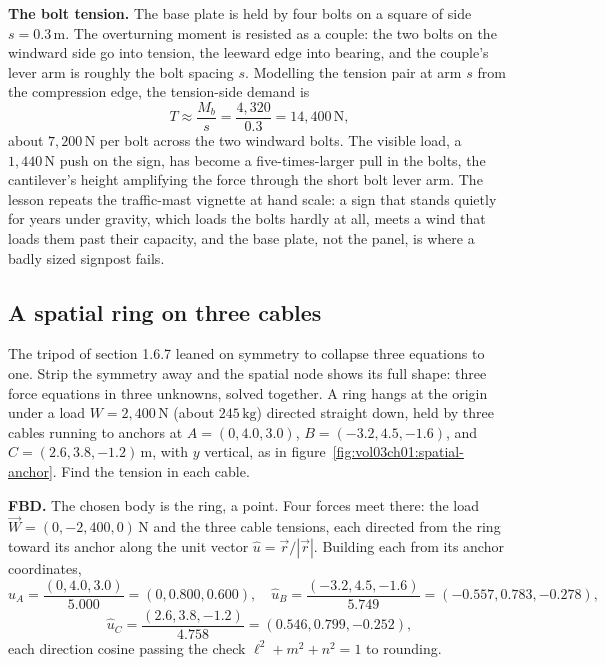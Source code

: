 \textbf{The bolt tension.} The base plate is held by four bolts on a square of
side $s = 0.3\,\si{\meter}$. The overturning moment is resisted as a couple: the
two bolts on the windward side go into tension, the leeward edge into bearing,
and the couple's lever arm is roughly the bolt spacing $s$. Modelling the
tension pair at arm $s$ from the compression edge, the tension-side demand is
\[
T \approx \frac{M_b}{s} = \frac{4{,}320}{0.3} = 14{,}400\,\text{N},
\]
about $7{,}200\,\text{N}$ per bolt across the two windward bolts. The visible
load, a $1{,}440\,\text{N}$ push on the sign, has become a five-times-larger
pull in the bolts, the cantilever's height amplifying the force through the
short bolt lever arm. The lesson repeats the traffic-mast vignette at hand
scale: a sign that stands quietly for years under gravity, which loads the bolts
hardly at all, meets a wind that loads them past their capacity, and the base
plate, not the panel, is where a badly sized signpost fails.

\subsection{A spatial ring on three cables}



The tripod of section 1.6.7 leaned on symmetry to collapse three equations to
one. Strip the symmetry away and the spatial node shows its full shape: three
force equations in three unknowns, solved together. A ring hangs at the origin
under a load $W = 2{,}400\,\text{N}$ (about $245\,\si{\kilogram}$) directed
straight down, held by three cables running to anchors at $A = (0, 4.0, 3.0)$,
$B = (-3.2, 4.5, -1.6)$, and $C = (2.6, 3.8, -1.2)\,\si{\meter}$, with $y$
vertical, as in figure~\ref{fig:vol03ch01:spatial-anchor}. Find the tension in
each cable.

\textbf{FBD.} The chosen body is the ring, a point. Four forces meet there: the
load $\vec{W} = (0, -2{,}400, 0)\,\text{N}$ and the three cable tensions, each
directed from the ring toward its anchor along the unit vector $\hat{u} =
\vec{r}/|\vec{r}|$. Building each from its anchor coordinates,
\[
\hat{u}_A = \frac{(0, 4.0, 3.0)}{5.000} = (0, 0.800, 0.600), \quad
\hat{u}_B = \frac{(-3.2, 4.5, -1.6)}{5.749} = (-0.557, 0.783, -0.278),
\]
\[
\hat{u}_C = \frac{(2.6, 3.8, -1.2)}{4.758} = (0.546, 0.799, -0.252),
\]
each direction cosine passing the check $\ell^2 + m^2 + n^2 = 1$ to rounding.

